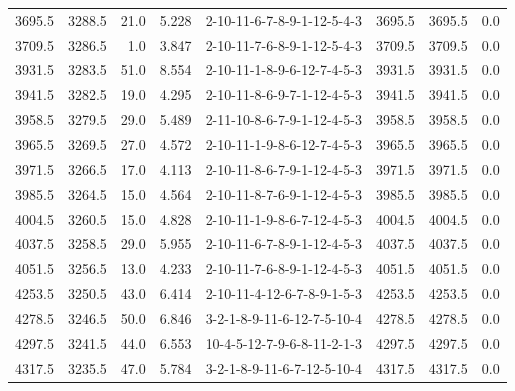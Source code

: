 \begin{tabular}{rrrrlrrr}
 3695.5 &  3288.5 &           21.0 &              5.228 &  2-10-11-6-7-8-9-1-12-5-4-3 &        3695.5 &          3695.5 &       0.0 \\
 3709.5 &  3286.5 &            1.0 &              3.847 &  2-10-11-7-6-8-9-1-12-5-4-3 &        3709.5 &          3709.5 &       0.0 \\
 3931.5 &  3283.5 &           51.0 &              8.554 &  2-10-11-1-8-9-6-12-7-4-5-3 &        3931.5 &          3931.5 &       0.0 \\
 3941.5 &  3282.5 &           19.0 &              4.295 &  2-10-11-8-6-9-7-1-12-4-5-3 &        3941.5 &          3941.5 &       0.0 \\
 3958.5 &  3279.5 &           29.0 &              5.489 &  2-11-10-8-6-7-9-1-12-4-5-3 &        3958.5 &          3958.5 &       0.0 \\
 3965.5 &  3269.5 &           27.0 &              4.572 &  2-10-11-1-9-8-6-12-7-4-5-3 &        3965.5 &          3965.5 &       0.0 \\
 3971.5 &  3266.5 &           17.0 &              4.113 &  2-10-11-8-6-7-9-1-12-4-5-3 &        3971.5 &          3971.5 &       0.0 \\
 3985.5 &  3264.5 &           15.0 &              4.564 &  2-10-11-8-7-6-9-1-12-4-5-3 &        3985.5 &          3985.5 &       0.0 \\
 4004.5 &  3260.5 &           15.0 &              4.828 &  2-10-11-1-9-8-6-7-12-4-5-3 &        4004.5 &          4004.5 &       0.0 \\
 4037.5 &  3258.5 &           29.0 &              5.955 &  2-10-11-6-7-8-9-1-12-4-5-3 &        4037.5 &          4037.5 &       0.0 \\
 4051.5 &  3256.5 &           13.0 &              4.233 &  2-10-11-7-6-8-9-1-12-4-5-3 &        4051.5 &          4051.5 &       0.0 \\
 4253.5 &  3250.5 &           43.0 &              6.414 &  2-10-11-4-12-6-7-8-9-1-5-3 &        4253.5 &          4253.5 &       0.0 \\
 4278.5 &  3246.5 &           50.0 &              6.846 &  3-2-1-8-9-11-6-12-7-5-10-4 &        4278.5 &          4278.5 &       0.0 \\
 4297.5 &  3241.5 &           44.0 &              6.553 &  10-4-5-12-7-9-6-8-11-2-1-3 &        4297.5 &          4297.5 &       0.0 \\
 4317.5 &  3235.5 &           47.0 &              5.784 &  3-2-1-8-9-11-6-7-12-5-10-4 &        4317.5 &          4317.5 &       0.0 \\

\end{tabular}
